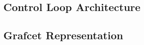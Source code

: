 \subsection{Control Loop Architecture} \label{sec:Control_Loop_Architecture}

\subsection{Grafcet Representation} \label{sec:Grafcet_Representation}

